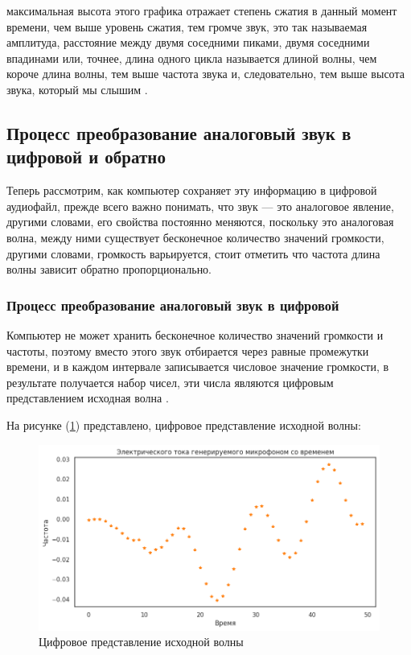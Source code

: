 

максимальная высота этого графика отражает степень сжатия в данный момент времени, чем выше уровень сжатия, тем громче звук, это так называемая амплитуда, расстояние между двумя соседними пиками, двумя соседними впадинами или, точнее, длина одного цикла называется длиной волны, чем короче длина волны, тем выше частота звука и, следовательно, тем выше высота звука, который мы слышим \cite{benesty2008microphone}. 

\subsection{Процесс преобразование аналоговый звук в цифровой и обратно}

Теперь рассмотрим, как компьютер сохраняет эту информацию в цифровой аудиофайл, прежде всего важно понимать, что звук — это аналоговое явление, другими словами, его свойства постоянно меняются, поскольку это аналоговая волна, между ними существует бесконечное количество значений громкости, другими словами, громкость варьируется, стоит отметить что частота длина волны зависит обратно пропорционально.

\subsubsection{Процесс преобразование аналоговый звук в цифровой}

Компьютер не может хранить бесконечное количество значений громкости и частоты, поэтому вместо этого звук отбирается через равные промежутки времени, и в каждом интервале записывается числовое значение громкости, в результате получается набор чисел, эти числа являются цифровым представлением исходная волна \cite{salah2021spatial}.

На рисунке (\ref{fig:ampl_and_time}) представлено, цифровое представление исходной волны: 
\begin{figure}[H]
	\centering
	\includegraphics[width=0.8\linewidth]{images/aplitude_and_time.png}
	\caption{Цифровое представление исходной волны}
	\label{fig:ampl_and_time}
\end{figure}

